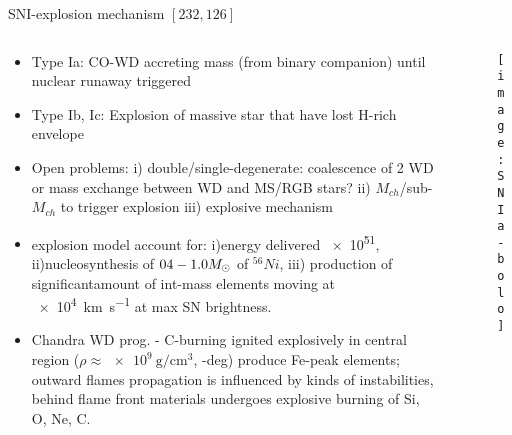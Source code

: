 \begin{frame}{SNI-explosion mechanism $[232,126]$}
\begin{columns}[T]
	\begin{column}{0.4\textwidth}
		\begin{itemize}
			\item Type Ia: CO-WD accreting mass (from binary companion) until nuclear runaway triggered
            \item Type Ib, Ic: Explosion of massive star that have lost H-rich envelope		
    \item Open problems: i) double/single-degenerate: coalescence of 2 WD or mass exchange between WD and MS/RGB stars? ii) $M_{ch}$/sub-$M_{ch}$ to trigger explosion iii) explosive mechanism
            \item explosion model account for: i)energy delivered \SI{e51}{\erg}, ii)nucleosynthesis of $04-1.0M_{\odot}$ of $^{56}Ni$, iii) production of significantamount of int-mass elements moving at \SI{e4}{\kilo\meter\per\second} at max SN brightness.
        \item Chandra WD prog. - C-burning ignited explosively in central region ($\rho\approx\SI{e9}{\gram\per\cubic\cm}$, \Pelectron-deg) produce Fe-peak elements; outward flames propagation is influenced by kinds of instabilities, behind flame front materials undergoes explosive burning of Si, O, Ne, C.
		\end{itemize}
	\end{column}
	\begin{column}{0.5\textwidth}
		\begin{figure}[!ht] 
		\texttt{[image: SNIa-bolo]}\label{fig:SNIa-bolo}
		\end{figure}
\end{column}\end{columns}
\end{frame}

